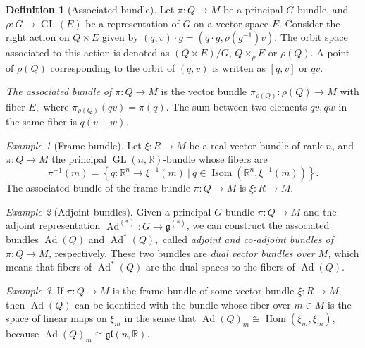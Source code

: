 \documentclass [xcolor=svgnames, t] {beamer}
\theoremstyle{definition}
\newtheorem{df}{Definition}
\theoremstyle{plain}
\theoremstyle{remark}
\newtheorem{ex}{Example}
\begin{document}
\begin{frame}[allowframebreaks]
\begin{df}[Associated bundle]
	Let $ \pi: Q \rightarrow M $ be a principal $ G $-bundle, and $ \rho: G \rightarrow \operatorname{GL}(E) $ be a representation of $ G $ on a vector space $ E. $ Consider the right action on $ Q\times E $ given by $ (q,v)\cdot g = (q\cdot g, \rho(g^{-1})v). $  The orbit space associated to this action is denoted as $ (Q\times E)/G $, $ Q\times_\rho E $ or $ \rho(Q). $  A point of $ \rho(Q) $ corresponding to the orbit of $ (q,v) $ is written as $ [q,v] $ or $ qv. $  

	\textit{The associated bundle of $ \pi:Q \rightarrow M $ } is the vector bundle $ \pi_{ \rho(Q)}: \rho(Q) \rightarrow M $ with fiber $ E, $ where $ \pi_{\rho(Q)}(qv)=\pi(q). $ The sum between two elements $ qv,qw$ in the same fiber is $ q(v+w). $  
\end{df}	
\begin{ex}[Frame bundle]
	Let $ \xi: R \rightarrow M $ be a real vector bundle of rank $ n $, and $ \pi: Q \rightarrow M $ the principal $ \operatorname{GL} (n, \mathbb{R}) $-bundle whose fibers are	
$$ \pi^{-1}(m) = \left\{ q: \mathbb{R}^n \rightarrow \xi^{-1}(m) \ | \ q\in \operatorname{Isom}( \mathbb{R}^n, \xi^{-1}(m)) \right\}.  $$
The associated bundle of the frame bundle $ \pi: Q \rightarrow M $ is $ \xi: R \rightarrow M. $ 
\end{ex}
\begin{ex}[Adjoint bundles]
	Given a principal $ G $-bundle $ \pi: Q \rightarrow M $ and the adjoint representation $ \operatorname{Ad}^{(*)}: G \rightarrow \mathfrak{g}^{(*)}  $,  we can construct the associated bundles $ \operatorname{Ad}(Q) $ and $ \operatorname{Ad}^*(Q), $ called \textit{adjoint and co-adjoint bundles of $ \pi:Q \rightarrow M $, } respectively. These two bundles are \textit{dual vector bundles over $ M $,} which means that fibers of $  \operatorname{Ad}^*(Q)$ are the dual spaces to the fibers of $ \operatorname{Ad} (Q). $ 
\end{ex}
\begin{ex}
	If $ \pi:Q \rightarrow M $ is the frame bundle of some vector bundle $ \xi: R \rightarrow M, $ then $ \operatorname{Ad}(Q) $ can be identified with the bundle whose fiber over $ m\in M $ is the space of linear maps on $ \xi_m $ in the sense that $ \operatorname{Ad} (Q)_m \cong \operatorname{Hom}(\xi_m,\xi_m),  $ because $ \operatorname{Ad}(Q)_m\cong \mathfrak{gl}(n, \mathbb{R}).  $ 
\end{ex}

\end{frame}
\end{document}
